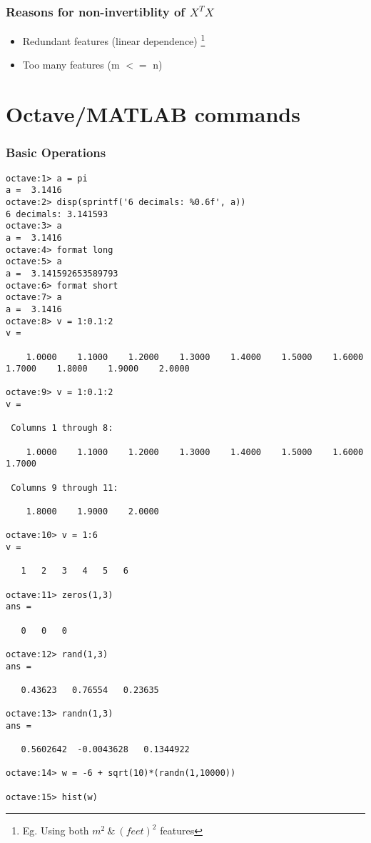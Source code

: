 \documentclass[12pt]{report}
\begin{document}
\vspace{5mm}

\subsubsection{Reasons for non-invertiblity of $X^T X$}
\begin{itemize}
	\item Redundant features (linear dependence) \footnote[3]{Eg. Using both $m^2 \  \& \  (feet)^2$ features}
	\item Too many features (m $<=$ n) 
\end{itemize}

\section{Octave/MATLAB commands}

\subsubsection{Basic Operations}
\begin{lstlisting}[basicstyle=\small]
octave:1> a = pi
a =  3.1416
octave:2> disp(sprintf('6 decimals: %0.6f', a))
6 decimals: 3.141593
octave:3> a
a =  3.1416
octave:4> format long
octave:5> a
a =  3.141592653589793
octave:6> format short
octave:7> a
a =  3.1416
octave:8> v = 1:0.1:2
v =

    1.0000    1.1000    1.2000    1.3000    1.4000    1.5000    1.6000    1.7000    1.8000    1.9000    2.0000

octave:9> v = 1:0.1:2
v =

 Columns 1 through 8:

    1.0000    1.1000    1.2000    1.3000    1.4000    1.5000    1.6000    1.7000

 Columns 9 through 11:

    1.8000    1.9000    2.0000

octave:10> v = 1:6
v =

   1   2   3   4   5   6

octave:11> zeros(1,3)
ans =

   0   0   0

octave:12> rand(1,3)
ans =

   0.43623   0.76554   0.23635

octave:13> randn(1,3)
ans =

   0.5602642  -0.0043628   0.1344922

octave:14> w = -6 + sqrt(10)*(randn(1,10000))

octave:15> hist(w)
\end{lstlisting}
\end{document}
